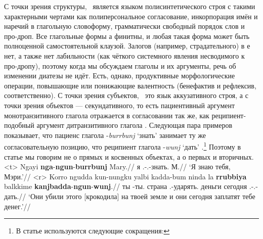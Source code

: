 С точки зрения структуры, \ является языком полисинтетического строя с такими характерными чертами как полиперсональное согласование, инкорпорация имён и наречий в глагольную словоформу, грамматически свободный порядок слов и про-дроп. Все глагольные формы  а финитны, и любая такая форма может быть полноценной самостоятельной клаузой. Залогов (например, страдательного) в  е нет, а также нет лабильности (как чёткого системного явления несводимого к про-дропу), поэтому когда мы обсуждаем глаголы и их аргументы, речь об изменении диатезы не идёт. Есть, однако, продуктивные морфологические операции, повышающие или понижающие валентность (бенефактив и рефлексив, соответственно). С точки зрения субъектов, \ это язык аккузативного строя, а с точки зрения объектов --- секундативного, то есть пациентивный аргумент монотранзитивного глагола отражается в согласовании так же, как реципиент-подобный аргумент дитранзитивного глагола  
\parencite{haspelmath05}. %
Следующая пара примеров показывает, что пациенс глагола -\textit{burrbunj} `знать'  %
занимает ту же согласовательную позицию, что реципиент глагола -\textit{wunj} `дать' .\footnote{В статье используются следующие сокращения: \printglossary[style=inline,type=\leipzigtype]} Поэтому в статье мы говорим не о прямых и косвенных объектах, а о первых и вторичных.
\a<t>\begingl
\gla Ngayi \textbf{nga}-\textbf{ngun}-\textbf{burrbunj} Mary.//
\glb я \Fsg.\Real-\Ssg.\Obj-знать.\Np{} М.//
\glft `Я знаю тебя, Мэри.'//%
\endgl\a<r>\begingl
\gla Korro ngudda kun-nungku yalbi kadda-bum ninda la \textbf{rrubbiya} balkkime \textbf{kanjbadda}-\textbf{ngun}-\textbf{wunj}.//
\glb \korro{} ты \Cliv-ты.\Gen{} страна \Tpl.\Real-ударять.\Pst{} \ninda{} \la{} деньги сегодня \Tpl.\Fut-\Ssg.\Obj-дать.\Np{}//
\glft `Они убили этого [крокодила] на твоей земле и они сегодня заплатят тебе денег.'//%
\endgl\xe

